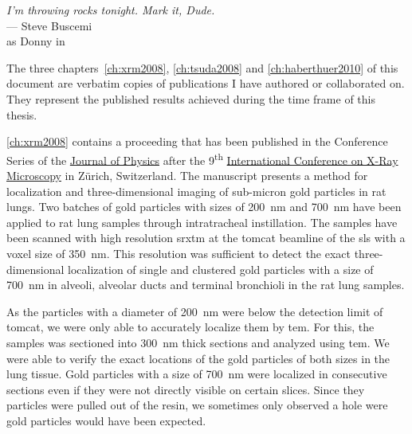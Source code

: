 \acresetall
{}
\label{ch:publications}
\begin{flushright}{\slshape I'm throwing rocks tonight. Mark it, Dude.} \\ \medskip
	--- Steve Buscemi\\as Donny in \citep{TheBigLebowski}
\end{flushright}
\vspace{6cm}

The three chapters~\ref{ch:xrm2008}, \ref{ch:tsuda2008} and \ref{ch:haberthuer2010} of this document are verbatim copies of publications I have authored or collaborated on. They represent the published results achieved during the time frame of this thesis.

\autoref{ch:xrm2008} contains a proceeding that has been published in the Conference Series of the \href{http://iopscience.iop.org/1742-6596/}{Journal of Physics} after the 9\textsuperscript{th} \href{http://xrm2008.web.psi.ch/}{International Conference on X-Ray Microscopy} in Zürich, Switzerland. The manuscript presents a method for localization and three-dimensional imaging of sub-micron gold particles in rat lungs. Two batches of gold particles with sizes of \SI{200}{\nano\meter} and \SI{700}{\nano\meter} have been applied to rat lung samples through intratracheal instillation. The samples have been scanned with high resolution \ac{srxtm} at the \ac{tomcat} beamline of the \ac{sls} with a voxel size of \SI{350}{\nano\meter}. This resolution was sufficient to detect the exact three-dimensional localization of single and clustered gold particles with a size of \SI{700}{\nano\meter} in alveoli, alveolar ducts and terminal bronchioli in the rat lung samples. 

As the particles with a diameter of \SI{200}{\nano\meter} were below the detection limit of \ac{tomcat}, we were only able to accurately localize them by \ac{tem}. For this, the samples was sectioned into \SI{300}{\nano\meter} thick sections and analyzed using \ac{tem}. We were able to verify the exact locations of the gold particles of both sizes in the lung tissue. Gold particles with a size of \SI{700}{\nano\meter} were localized in consecutive sections even if they were not directly visible on certain slices. Since they particles were pulled out of the resin, we sometimes only observed a hole were gold particles would have been expected.

